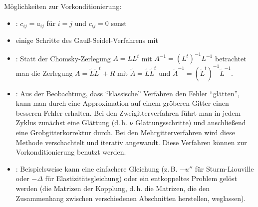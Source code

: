 \begin{Bem}
    Möglichkeiten zur Vorkonditionierung:
    \begin{itemize}
        \item
        :
        $c_{ij} = a_{ij}$ für $i = j$ und $c_{ij} = 0$ sonst

        \item
        einige Schritte des Gauß-Seidel-Verfahrens mit 

        \item
        :
        Statt der Chomsky-Zerlegung $A = LL^t$ mit $A^{-1} = (L^t)^{-1} L^{-1}$
        betrachtet man die Zerlegung $A = \widetilde{L}\widetilde{L}^t + R$
        mit $\widetilde{A} = \widetilde{L}\widetilde{L}^t$ und
        $\widetilde{A}^{-1} = (\widetilde{L}^t)^{-1} \widetilde{L}^{-1}$.

        \item
        :
        Aus der Beobachtung, dass "`klassische"' Verfahren den Fehler
        "`glätten"', kann man durch eine Approximation auf einem gröberen
        Gitter einen besseren Fehler erhalten.
        Bei den Zweigitterverfahren führt man in jedem Zyklus zunächst
        eine Glättung (d.\,h. $\nu$ Glättungsschritte) und anschließend
        eine Grobgitterkorrektur durch.
        Bei den Mehrgitterverfahren wird diese Methode verschachtelt und
        iterativ angewandt.
        Diese Verfahren können zur Vorkonditionierung benutzt werden.

        \item
        :
        Beispielsweise kann eine einfachere Gleichung
        (z.\,B. $-u''$ für Sturm-Liouville oder
        $-\Delta$ für Elastizitätsgleichung) oder
        ein entkoppeltes Problem gelöst werden
        (die Matrizen der Kopplung, d.\,h. die Matrizen, die den
        Zusammenhang zwischen verschiedenen Abschnitten herstellen,
        weglassen).
    \end{itemize}
\end{Bem}

\pagebreak
